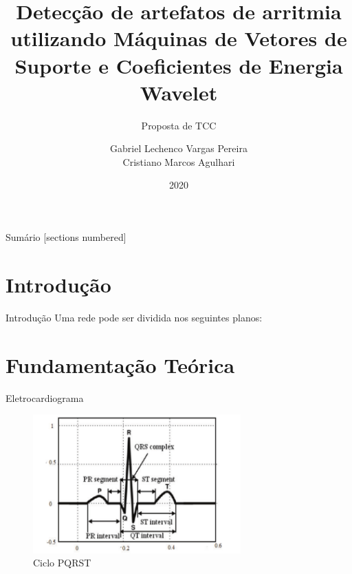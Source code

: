 \documentclass[10pt]{beamer}
\title{Detecção de artefatos de arritmia utilizando Máquinas de Vetores de Suporte e Coeficientes de Energia Wavelet}
\subtitle{Proposta de TCC}
\date{2020}
\author{Gabriel Lechenco Vargas Pereira \\
Cristiano Marcos Agulhari}
\institute{Universidade Tecnológica Federal do Paraná - UTFPR}
\begin{document}

\maketitle

\begin{frame}{Sumário}
  [sections numbered]
  \tableofcontents[hideallsubsections]
\end{frame}

\section{Introdução}

\begin{frame}{Introdução}
    Uma rede pode ser dividida nos seguintes planos:
\end{frame}

\section{Fundamentação Teórica}

\begin{frame}{Eletrocardiograma}
    \begin{figure}[]
      \centering
      \includegraphics[width=8cm]{images/pqrst.png}
      \caption{Ciclo PQRST \cite{faziludeen_ecg_2013}}
      \label{fig:pqrst}
    \end{figure}
\end{frame}
\end{document}
